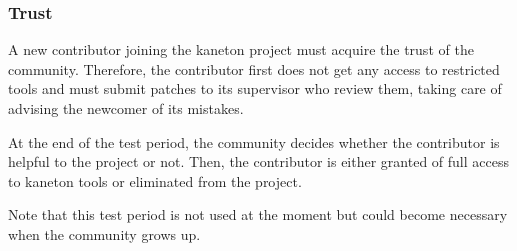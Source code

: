 
\subsubsection{Trust}

A new contributor joining the kaneton project must acquire the trust of
the community. Therefore, the contributor first does not get any access
to restricted tools and must submit patches to its supervisor who review
them, taking care of advising the newcomer of its mistakes.

At the end of the test period, the community decides whether the contributor
is helpful to the project or not. Then, the contributor is either granted
of full access to kaneton tools or eliminated from the project.

Note that this test period is not used at the moment but could become
necessary when the community grows up.
